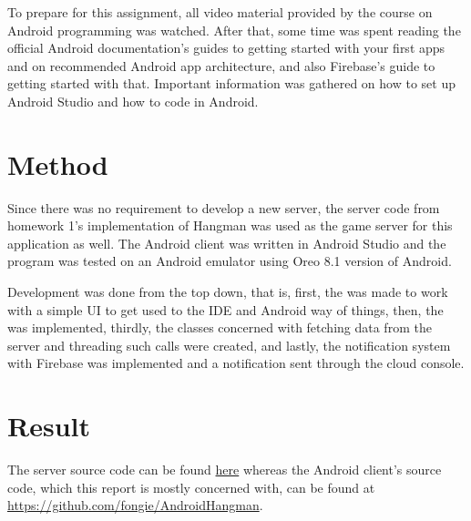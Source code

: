 \documentclass[a4paper]{scrartcl}
\begin{document}
To prepare for this assignment, all video material provided by the course on Android programming was watched. After that, some time was spent reading the official Android documentation's guides to getting started with your first apps and on recommended Android app architecture, and also Firebase's guide to getting started with that. Important information was gathered on how to set up Android Studio and how to code in Android.

\section{Method}

\noindent Since there was no requirement to develop a new server, the server code from homework 1's implementation of Hangman was used as the game server for this application as well. The Android client was written in Android Studio and the program was tested on an Android emulator using Oreo 8.1 version of Android.

Development was done from the top down, that is, first, the  was made to work with a simple UI to get used to the IDE and Android way of things, then, the  was implemented, thirdly, the classes concerned with fetching data from the server and threading such calls were created, and lastly, the notification system with Firebase was implemented and a notification sent through the cloud console.

\section{Result}

\noindent The server source code can be found \href{https://github.com/fongie/Hangman/tree/master/hangmanserver}{here} whereas the Android client's source code, which this report is mostly concerned with, can be found at \href{https://github.com/fongie/AndroidHangman}{https://github.com/fongie/AndroidHangman}.
\end{document}
